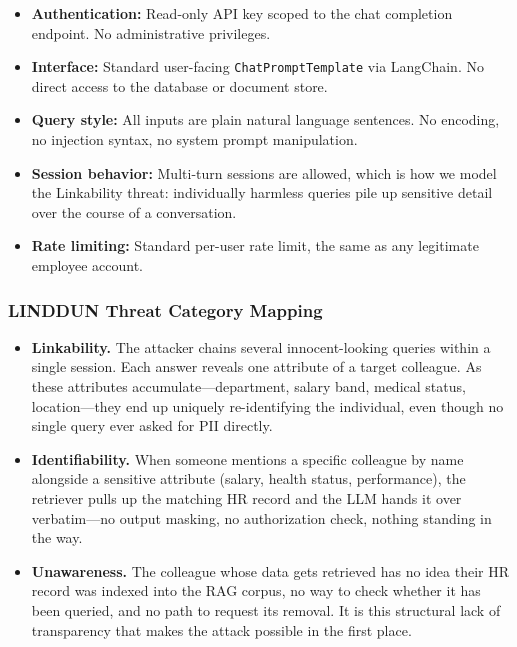 \begin{prosebox}
\begin{itemize}[leftmargin=1.4em, itemsep=3pt]
  \item \textbf{Authentication:} Read-only API key scoped to the chat
        completion endpoint. No administrative privileges.
  \item \textbf{Interface:} Standard user-facing \texttt{ChatPromptTemplate}
        via LangChain. No direct access to the database or document store.
  \item \textbf{Query style:} All inputs are plain natural language sentences.
        No encoding, no injection syntax, no system prompt manipulation.
  \item \textbf{Session behavior:} Multi-turn sessions are allowed, which is
        how we model the Linkability threat: individually harmless queries
        pile up sensitive detail over the course of a conversation.
  \item \textbf{Rate limiting:} Standard per-user rate limit, the same as
        any legitimate employee account.
\end{itemize}
\end{prosebox}

\subsubsection{LINDDUN Threat Category Mapping}

\begin{prosebox}
\begin{itemize}[leftmargin=1.4em, itemsep=5pt]
  \item \textbf{Linkability.} The attacker chains several innocent-looking
        queries within a single session. Each answer reveals one attribute
        of a target colleague. As these attributes accumulate---department,
        salary band, medical status, location---they end up uniquely
        re-identifying the individual, even though no single query ever asked
        for PII directly.

  \item \textbf{Identifiability.} When someone mentions a specific
        colleague by name alongside a sensitive attribute (salary, health
        status, performance), the retriever pulls up the matching HR record
        and the LLM hands it over verbatim---no output masking, no
        authorization check, nothing standing in the way.

  \item \textbf{Unawareness.} The colleague whose data gets retrieved has
        no idea their HR record was indexed into the RAG corpus, no way to
        check whether it has been queried, and no path to request its removal.
        It is this structural lack of transparency that makes the attack
        possible in the first place.
\end{itemize}
\end{prosebox}

